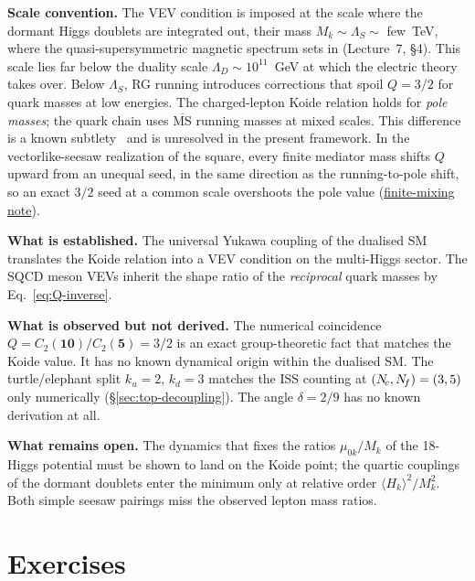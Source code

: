 \documentclass[11pt,a4paper]{article}
\begin{document}
\textbf{Scale convention.}  The VEV condition is imposed at
the scale where the dormant Higgs doublets are integrated out,
their mass $M_k \sim \Lambda_S \sim$ few~TeV, where the
quasi-supersymmetric magnetic spectrum sets in (Lecture~7, \S4).
This scale lies far below the duality scale
$\Lambda_D \sim 10^{11}$~GeV at which the electric theory takes
over.  Below $\Lambda_S$, RG running introduces corrections that
spoil $Q = 3/2$ for quark masses at low energies.  The
charged-lepton Koide relation holds for \emph{pole masses}; the
quark chain uses $\overline{\text{MS}}$ running masses at mixed
scales.  This difference is a known subtlety~\cite{Sumino2009} and
is unresolved in the present framework.
In the vectorlike-seesaw realization of the square, every finite
mediator mass shifts $Q$ upward from an unequal seed, in the same
direction as the running-to-pole shift, so an exact $3/2$ seed at a
common scale overshoots the pole value
(\href{https://github.com/arivero/dualsm/blob/master/papers/COMPOSITE-FLAVOUR-MATCHING.md\#finite-mixing-the-exact-koide-shift-and-the-reconstructed-mediator-mass}{finite-mixing note}).

\textbf{What is established.}  The universal Yukawa coupling of
the dualised SM translates the Koide relation into a VEV
condition on the multi-Higgs sector.  The SQCD meson VEVs inherit
the shape ratio of the \emph{reciprocal} quark masses by
Eq.~\eqref{eq:Q-inverse}.

\textbf{What is observed but not derived.}  The numerical
coincidence $Q = C_2(\mathbf{10})/C_2(\mathbf{5}) = 3/2$ is an
exact group-theoretic fact that matches the Koide value.
It has no known dynamical origin within the dualised SM.
The turtle/elephant split $k_u = 2$, $k_d = 3$ matches the ISS
counting at $(N_{\!c},N_{\!f}) = (3,5)$ only numerically
(\S\ref{sec:top-decoupling}).
The angle $\delta = 2/9$ has no known derivation at all.

\textbf{What remains open.}  The dynamics that fixes the ratios
$\mu_{0k}/M_k$ of the 18-Higgs potential must be shown to land on
the Koide point; the quartic couplings of the dormant doublets enter
the minimum only at relative order $\langle H_k\rangle^2/M_k^2$.
Both simple seesaw pairings miss the observed lepton mass ratios.

\section{Exercises}
\label{sec:exercises}
\end{document}
